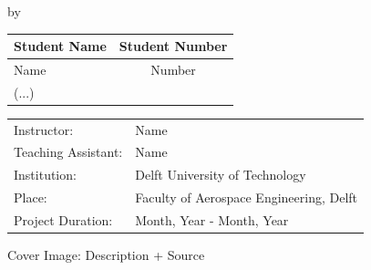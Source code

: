 \begin{titlepage}

\begin{center}

{\makeatletter
\largetitlestyle\fontsize{45}{45}\selectfont\@title
\makeatother}

{\makeatletter
\ifdefvoid{\@subtitle}{}{\titlestyle\fontsize{20}{20}\selectfont\@subtitle}
\makeatother}

\bigskip
\bigskip

by

\bigskip
\bigskip

{\makeatletter
\largetitlestyle\fontsize{25}{25}\selectfont\@author
\makeatother}

\bigskip
\bigskip

\setlength\extrarowheight{2pt}
\begin{tabular}{lc}
    Student Name & Student Number \\\hline
    Name & Number \\
    (...) \\
\end{tabular}

\vfill

\begin{tabular}{ll}
    Instructor: & Name \\
    Teaching Assistant: & Name \\
    Institution: & Delft University of Technology \\
    Place: & Faculty of Aerospace Engineering, Delft \\
    Project Duration: & Month, Year - Month, Year
\end{tabular}

\vspace{1cm}
\small{Cover Image: Description + Source}

\end{center}


\end{titlepage}
